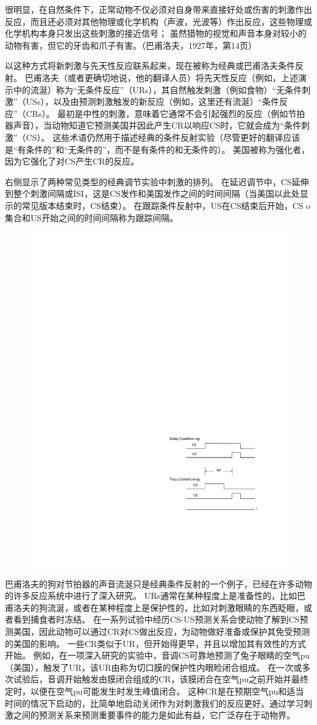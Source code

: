 很明显，在自然条件下，正常动物不仅必须对自身带来直接好处或伤害的刺激作出反应，而且还必须对其他物理或化学机构（声波，光波等）作出反应，这些物理或化学机构本身只发出这些刺激的接近信号；
虽然猎物的视觉和声音本身对较小的动物有害，但它的牙齿和爪子有害。（巴甫洛夫，1927年，第14页）


以这种方式将新刺激与先天性反应联系起来，现在被称为经典或巴甫洛夫条件反射。
巴甫洛夫（或者更确切地说，他的翻译人员）将先天性反应（例如，上述演示中的流涎）称为“无条件反应”（URs），其自然触发刺激（例如食物）“无条件刺激”（USs），以及由预测刺激触发的新反应（例如，这里还有流涎）“条件反应”（CRs）。
最初是中性的刺激，意味着它通常不会引起强烈的反应（例如节拍器声音），当动物知道它预测美国并因此产生CR以响应CS时，它就会成为“条件刺激”（CS）。
这些术语仍然用于描述经典的条件反射实验（尽管更好的翻译应该是“有条件的”和“无条件的”，而不是有条件的和无条件的）。
美国被称为强化者，因为它强化了对CS产生CR的反应。


右侧显示了两种常见类型的经典调节实验中刺激的排列。
在延迟调节中，CS延伸到整个刺激间隔或ISI，这是CS发作和美国发作之间的时间间隔（当美国以此处显示的常见版本结束时，CS结束）。
在跟踪条件反射中，US在CS结束后开始，CS o集合和US开始之间的时间间隔称为跟踪间隔。


\begin{figure}[!htb]
	\centering
	\includegraphics[width=0.5\linewidth]{chap11/fig_11_0}
	\caption{  \label{fig:11_0}}
\end{figure}


巴甫洛夫的狗对节拍器的声音流涎只是经典条件反射的一个例子，已经在许多动物的许多反应系统中进行了深入研究。
URs通常在某种程度上是准备性的，比如巴甫洛夫的狗流涎，或者在某种程度上是保护性的，比如对刺激眼睛的东西眨眼，或者看到捕食者时冻结。
在一系列试验中经历CS-US预测关系会使动物了解到CS预测美国，因此动物可以通过CR对CS做出反应，为动物做好准备或保护其免受预测的美国的影响。
一些CR类似于UR，但开始得更早，并且以增加其有效性的方式开始。
例如，在一项深入研究的实验中，音调CS可靠地预测了兔子眼睛的空气pu（美国），触发了UR，该UR由称为切口膜的保护性内眼睑闭合组成。
在一次或多次试验后，音调开始触发由膜闭合组成的CR，该膜闭合在空气pu之前开始并最终定时，以便在空气pu可能发生时发生峰值闭合。
这种CR是在预期空气pu和适当时间的情况下启动的，比简单地启动关闭作为对刺激我们的反应更好。通过学习刺激之间的预测关系来预测重要事件的能力是如此有益，它广泛存在于动物界。





